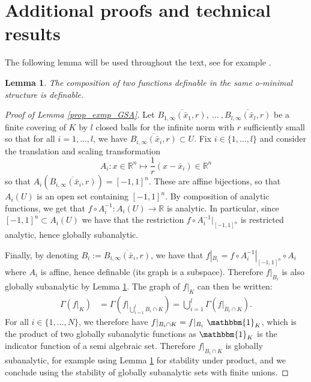 \documentclass[11pt]{article}
\newcommand{\R}{\mathbb R}
\newcommand{\1}{\mathbbm{1}}
\newtheorem{lem}{Lemma}[section]
\numberwithin{equation}{section}
\begin{document}
\appendix






\section{Additional proofs and technical results}
\label{sec:proofLemma}
The following lemma will be used throughout the text, see for example \cite[Exercise 1.11]{coste2000introduction}.
\begin{lem}
	The composition of two functions definable in the same o-minimal structure is definable.
	\label{lem:definableComposition}
\end{lem}

\begin{proof}[Proof of Lemma \ref{prop_exmp_GSA}]
	Let $\overline{B_{1,\infty}(\bar{x}_{1},r)},\:\ldots\:,\overline{B_{l,\infty}(\bar{x}_{l},r)}$ be a finite covering of $K$ by $l$ closed balls for the infinite norm with $r$ sufficiently small so that for all $i = 1,\ldots, l$, we have  $\overline{B_{i,\infty}(\bar{x}_{i},r)} \subset U$. Fix $i\in \{1, \ldots, l\}$ and consider the translation and scaling transformation 
\begin{equation*}
A_{i}: x \in\R^{n} \longmapsto \frac{1}{r}(x-\bar{x}_{i}) \in \mathbb{R}^{n}
\end{equation*}
so that $ A_{i}\left(\overline{B_{i,\infty}(\bar{x}_{i},r)}\right)=[-1,1]^{n}$.  These are affine bijections, so that $A_{i}(U)$ is an open set containing $[-1,1]^{n}$. By composition of analytic functions, we get that $f\circ A_{i}^{-1}:A_{i}(U)\longrightarrow \mathbb{R}$ is analytic. In particular, since $[-1,1]^{n}\subset A_{i}(U)$ we have that the restriction $f\circ A_{i}^{-1}|_{[-1,1]^{n}}$ is restricted analytic, hence globally subanalytic.

	Finally, by denoting $B_{i}:=\overline{B_{i,\infty}(\bar{x}_{i},r)}$, we have that $f|_{B_{i}}=f\circ A_{i}^{-1}|_{[-1,1]^{n}}\circ A_{i}$ where $A_{i}$ is affine, hence definable (its graph is a subspace). Therefore $f|_{B_{i}}$ is also globally subanalytic by Lemma \ref{lem:definableComposition}.
The graph of $f|_{K}$ can then be written: 
\begin{align*}
    \Gamma\left(f|_{K}\right)&=\Gamma\left(f|_{\bigcup_{i=1}^{l}B_{i}\cap K}\right) =\bigcup_{i=1}^{l} \Gamma\left(f|_{B_{i}\cap K}\right).
\end{align*}
	For all $i\in \{1,\ldots,N\}$, we therefore have $f|_{B_{i}\cap K}=f|_{B_{i}}\ \mathbbm{1}_{K}$, which is the product of two globally subanalytic functions as $\mathbbm{1}_{K}$ is the indicator function of a semi algebraic set.  Therefore $f|_{B_{i}\cap K}$ is globally subanalytic, for example using Lemma \ref{lem:definableComposition} for stability under product, and we conclude using the stability of globally subanalytic sets with finite unions.

\end{proof}
\end{document}
